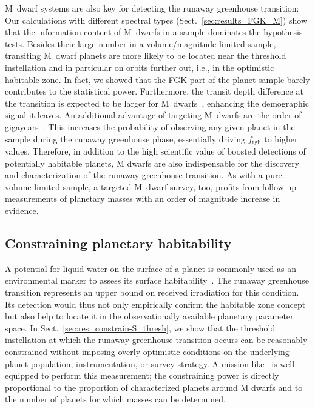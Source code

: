 \documentclass[twocolumn,twocolappendix,linenumbers]{aastex631}
\begin{document}
M~dwarf systems are also key for detecting the runaway greenhouse transition:
Our calculations with different spectral types (Sect.~\ref{sec:results_FGK_M}) show that the information content of M~dwarfs in a sample dominates the hypothesis tests.
Besides their large number in a volume/magnitude-limited sample, transiting M~dwarf planets are more likely to be located near the threshold instellation and in particular on orbits further out, i.e., in the optimistic habitable zone.
In fact, we showed that the FGK part of the planet sample barely contributes to the statistical power.
Furthermore, the transit depth difference at the transition is expected to be larger for M~dwarfs~\citep[$\sim \SI{100}{\ppm}$ for early, $\sim \SI{1000}{\ppm}$ for late M~stars,][]{Turbet2019}, enhancing the demographic signal it leaves.
An additional advantage of targeting M~dwarfs are  the order of gigayears~\citep{Luger2015}.
This increases the probability of observing any given planet in the sample during the runaway greenhouse phase, essentially driving $f_\mathrm{rgh}$ to higher values.
Therefore, in addition to the high scientific value of boosted detections of potentially habitable planets, M dwarfs are also indispensable for the discovery and characterization of the runaway greenhouse transition.
As with a pure volume-limited sample, a targeted M~dwarf survey, too, profits from follow-up measurements of planetary masses with an order of magnitude increase in evidence.


\subsection{Constraining planetary habitability}\label{sec:habitability}
A potential for liquid water on the surface of a planet is commonly used as an environmental marker to assess its surface habitability~\citep{Huang1959,Hart1978,Kasting1993,Kaltenegger2011,Kopparapu2013}.
The runaway greenhouse transition represents an upper bound on received irradiation for this condition.
Its detection would thus not only empirically confirm the habitable zone concept but also help to locate it in the observationally available planetary parameter space.
In Sect.~\ref{sec:res_constrain-S_thresh}, we show that the threshold instellation at which the runaway greenhouse transition occurs can be reasonably constrained without imposing overly optimistic conditions on the underlying planet population, instrumentation, or survey strategy.
A mission like \plato\ is well equipped to perform this measurement; the constraining power is directly proportional to the proportion of characterized planets around M dwarfs and to the number of planets for which masses can be determined.
\end{document}
